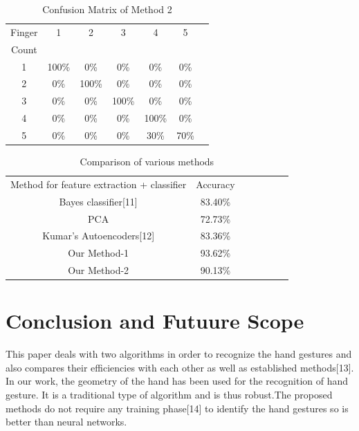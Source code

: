 \documentclass[conference]{IEEEtran}
\begin{document}
\begin{table}[h!]
\caption{Confusion Matrix of Method 2}
\begin{center}
\begin{tabular}{|c|c|c|c|c|c|c|}
\hline
\multicolumn{1}{|c|}{Finger}
& \multicolumn{1}{|c|}{1}
& \multicolumn{1}{|c|}{2}
& \multicolumn{1}{|c|}{3}
& \multicolumn{1}{|c|}{4}
& \multicolumn{1}{|c|}{5}\\
Count &  &  &  &  &\\ \hline
1  &  100\%  &  0\%  & 0\%  & 0\% & 0\%\\ \hline
2  &  0\%  &  100\%  & 0\%  & 0\% & 0\%\\ \hline
3  &  0\%  &  0\%  & 100\%  & 0\% & 0\%\\ \hline
4  &  0\%  &  0\%  & 0\%  & 100\% & 0\%\\ \hline
5  &  0\%  &  0\%  & 0\%  & 30\% & 70\%\\ \hline
\end{tabular}
\label{table-tab2}
\end{center}
\end{table}


%
%
%

\begin{table}[h!]
\caption{Comparison of various methods}
\begin{center}
\begin{tabular}{|c|c|c|c|c|c|c|}
\hline
\multicolumn{1}{|c|}{Method for feature extraction + classifier}
& \multicolumn{1}{|c|}{Accuracy}\\
Bayes classifier[11] & 83.40\% \\ \hline
PCA & 72.73\% \\ \hline
Kumar's Autoencoders[12] & 83.36\% \\ \hline
Our Method-1 & 93.62\% \\ \hline
Our Method-2 & 90.13\% \\ \hline
\end{tabular}
\label{table-tab2}
\end{center}
\end{table}


\section{Conclusion and Futuure Scope}
This paper deals with two algorithms in order to recognize the hand gestures and also compares their efficiencies with each other as well as established methods[13]. In our work, the geometry of the hand has been used for the recognition of hand gesture. It is a traditional type of algorithm and is thus robust.The proposed methods do not require any training phase[14] to identify the hand gestures so is better than neural networks. 
\end{document}

